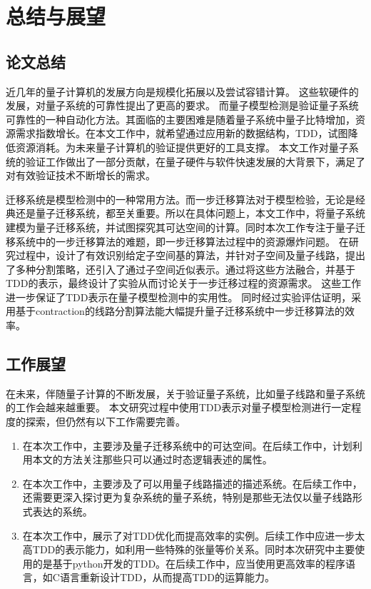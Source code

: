 \chapter{总结与展望}
\section{论文总结}
近几年的量子计算机的发展方向是规模化拓展以及尝试容错计算。
这些软硬件的发展，对量子系统的可靠性提出了更高的要求。
而量子模型检测是验证量子系统可靠性的一种自动化方法。其面临的主要困难是随着量子系统中量子比特增加，资源需求指数增长。在本文工作中，就希望通过应用新的数据结构，TDD，试图降低资源消耗。为未来量子计算机的验证提供更好的工具支撑。
本文工作对量子系统的验证工作做出了一部分贡献，在量子硬件与软件快速发展的大背景下，满足了对有效验证技术不断增长的需求。

迁移系统是模型检测中的一种常用方法。而一步迁移算法对于模型检验，无论是经典还是量子迁移系统，都至关重要。所以在具体问题上，本文工作中，将量子系统建模为量子迁移系统，并试图探究其可达空间的计算。同时本次工作专注于量子迁移系统中的一步迁移算法的难题，即一步迁移算法过程中的资源爆炸问题。
在研究过程中，设计了有效识别给定子空间基的算法，并针对子空间及量子线路，提出了多种分割策略，还引入了通过子空间近似表示。通过将这些方法融合，并基于TDD的表示，最终设计了实验从而讨论关于一步迁移过程的资源需求。
这些工作进一步保证了TDD表示在量子模型检测中的实用性。
同时经过实验评估证明，采用基于contraction的线路分割算法能大幅提升量子迁移系统中一步迁移算法的效率。


\section{工作展望}

在未来，伴随量子计算的不断发展，关于验证量子系统，比如量子线路和量子系统的工作会越来越重要。
本文研究过程中使用TDD表示对量子模型检测进行一定程度的探索，但仍然有以下工作需要完善。
\begin{enumerate}
    \item 在本次工作中，主要涉及量子迁移系统中的可达空间。在后续工作中，计划利用本文的方法关注那些只可以通过时态逻辑表述的属性。
    \item 在本次工作中，主要涉及了可以用量子线路描述的描述系统。在后续工作中，还需要更深入探讨更为复杂系统的量子系统，特别是那些无法仅以量子线路形式表达的系统。
    \item 在本次工作中，展示了对TDD优化而提高效率的实例。后续工作中应进一步太高TDD的表示能力，如利用一些特殊的张量等价关系。同时本次研究中主要使用的是基于python开发的TDD。在后续工作中，应当使用更高效率的程序语言，如C语言重新设计TDD，从而提高TDD的运算能力。
\end{enumerate}

